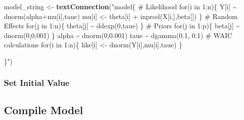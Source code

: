 \documentclass[
]{article}
\newenvironment{Shaded}{\begin{snugshade}}{\end{snugshade}}
\newcommand{\ControlFlowTok}[1]{\textcolor[rgb]{0.13,0.29,0.53}{\textbf{#1}}}
\newcommand{\DecValTok}[1]{\textcolor[rgb]{0.00,0.00,0.81}{#1}}
\newcommand{\FunctionTok}[1]{\textcolor[rgb]{0.13,0.29,0.53}{\textbf{#1}}}
\newcommand{\NormalTok}[1]{#1}
\newcommand{\OtherTok}[1]{\textcolor[rgb]{0.56,0.35,0.01}{#1}}
\newcommand{\SpecialCharTok}[1]{\textcolor[rgb]{0.81,0.36,0.00}{\textbf{#1}}}
\newcommand{\StringTok}[1]{\textcolor[rgb]{0.31,0.60,0.02}{#1}}
\begin{document}
\begin{Shaded}
\begin{Highlighting}[]
\NormalTok{model\_string }\OtherTok{\textless{}{-}} \FunctionTok{textConnection}\NormalTok{(}\StringTok{"model\{}
\StringTok{  \# Likelihood}
\StringTok{  for(i in 1:n)\{}
\StringTok{    Y[i] \textasciitilde{} dnorm(alpha+mu[i],taue)}
\StringTok{    mu[i] \textless{}{-} theta[i] + inprod(X[i,],beta[])}
\StringTok{  \}}
\StringTok{  }
\StringTok{  \# Random Effects }
\StringTok{  for(j in 1:n)\{}
\StringTok{    theta[j] \textasciitilde{} ddexp(0,taue)}
\StringTok{  \}}
\StringTok{  }
\StringTok{  \# Priors}
\StringTok{  for(j in 1:p)\{}
\StringTok{    beta[j] \textasciitilde{} dnorm(0,0.001)}
\StringTok{  \}}
\StringTok{  }
\StringTok{  alpha \textasciitilde{} dnorm(0,0.001)}
\StringTok{  taue \textasciitilde{} dgamma(0.1, 0.1)}
\StringTok{  }
\StringTok{  \# WAIC calculations}
\StringTok{  for(i in 1:n)\{}
\StringTok{    like[i] \textless{}{-} dnorm(Y[i],mu[i],taue)}
\StringTok{  \}}

\StringTok{\}"}\NormalTok{)}
\end{Highlighting}
\end{Shaded}

\subsubsection{Set Initial Value}\label{set-initial-value-3}

\begin{Shaded}
\end{Shaded}

\subsection{Compile Model}\label{compile-model-3}
\end{document}

